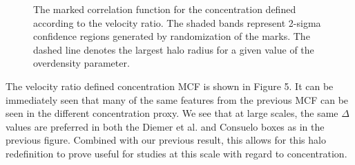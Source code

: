 \documentclass[usenatbib,usegraphicx,letterpaper]{mn2e}
\begin{document}
\begin{figure}
	\caption{The marked correlation function for the concentration defined according to the velocity ratio. The shaded bands represent 2-sigma confidence regions generated by randomization of the marks. The dashed line denotes the largest halo radius for a given value of the overdensity parameter.}
\end{figure}

The velocity ratio defined concentration MCF is shown in Figure 5. It can be immediately seen that many of the same features from the previous MCF can be seen in the different concentration proxy. We see that at large scales, the same $\Delta$ values are preferred in both the Diemer et al. and Consuelo boxes as in the previous figure. Combined with our previous result, this allows for this halo redefinition to prove useful for studies at this scale with regard to concentration.
\end{document}
